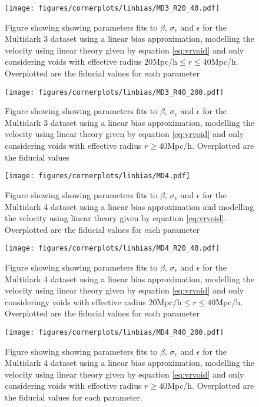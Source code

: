 \begin{figure}[htbp]\label{fig:linbiasMD3R2040}
    \texttt{[image: figures/cornerplots/linbias/MD3\_R20\_40.pdf]}
    \caption{Figure showing showing parameters fits to $\beta$, $\sigma_v$ and $\epsilon$ for the Multidark 3 dataset using a linear bias approximation, modelling the velocity using linear theory given by equation \ref{eq:vrvoid} and only considering voids with effective radius $20$Mpc/h$\leq r \leq 40$Mpc/h. Overplotted are the fiducial values for each parameter}
\end{figure}

\begin{figure}[htbp]\label{fig:linbiasMD3R40}
    \texttt{[image: figures/cornerplots/linbias/MD3\_R40\_200.pdf]}
    \caption{Figure showing showing parameters fits to $\beta$, $\sigma_v$ and $\epsilon$ for the Multidark 3 dataset using a linear bias approximation, modelling the velocity using linear theory given by equation \ref{eq:vrvoid} and only considering voids with effective radius $r\geq 40$Mpc/h. Overplotted are the fiducial values}
\end{figure}

\begin{figure}[htbp]\label{fig:linbiasMD4}
    \texttt{[image: figures/cornerplots/linbias/MD4.pdf]}
    \caption{Figure showing showing parameters fits to $\beta$, $\sigma_v$ and $\epsilon$ for the Multidark 4 dataset using a linear bias approximation and  modelling the velocity using linear theory given by equation \ref{eq:vrvoid}.
    Overplotted are the fiducial values for each parameter}
\end{figure}

\begin{figure}[htbp]\label{fig:linbiasMD4R2040}
    \texttt{[image: figures/cornerplots/linbias/MD4\_R20\_40.pdf]}
    \caption{Figure showing showing parameters fits to $\beta$, $\sigma_v$ and $\epsilon$ for the Multidark 4 dataset using a linear bias approximation, modelling the velocity using linear theory given by equation \ref{eq:vrvoid} and only consideringy voids with effective radius $20$Mpc/h$\leq r \leq 40$Mpc/h. Overplotted are the fiducial values for each parameter}
\end{figure}

\begin{figure}[htbp]\label{fig:linbiasMD4R40}
    \texttt{[image: figures/cornerplots/linbias/MD4\_R40\_200.pdf]}
    \caption{Figure showing showing parameters fits to $\beta$, $\sigma_v$ and $\epsilon$ for the Multidark 4 dataset using a linear bias approximation, modelling the velocity using linear theory given by equation \ref{eq:vrvoid} and only considering voids with effective radius $r\geq 40$Mpc/h. Overplotted are the fiducial values for each parameter.}
\end{figure}
